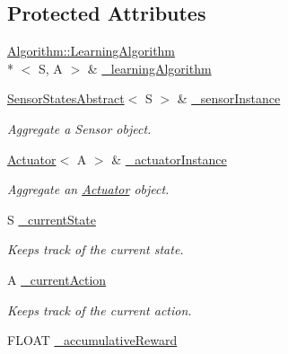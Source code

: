 \subsection*{Protected Attributes}
\begin{DoxyCompactItemize}
\item 
\hyperlink{classAI_1_1Algorithm_1_1LearningAlgorithm}{Algorithm\-::\-Learning\-Algorithm}\\*
$<$ S, A $>$ \& \hyperlink{classAI_1_1Agent_ae61529c109e21748dca77509b58f1f8e}{\-\_\-learning\-Algorithm}
\item 
\hypertarget{classAI_1_1Agent_a47f05ad26341cb3dd19790deab83b027}{\hyperlink{classAI_1_1SensorStatesAbstract}{Sensor\-States\-Abstract}$<$ S $>$ \& \hyperlink{classAI_1_1Agent_a47f05ad26341cb3dd19790deab83b027}{\-\_\-sensor\-Instance}}\label{classAI_1_1Agent_a47f05ad26341cb3dd19790deab83b027}

\begin{DoxyCompactList}\small\item\em Aggregate a Sensor object. \end{DoxyCompactList}\item 
\hypertarget{classAI_1_1Agent_a1a9517c181c1514ffa4f8df2bb68a5dc}{\hyperlink{classAI_1_1Actuator}{Actuator}$<$ A $>$ \& \hyperlink{classAI_1_1Agent_a1a9517c181c1514ffa4f8df2bb68a5dc}{\-\_\-actuator\-Instance}}\label{classAI_1_1Agent_a1a9517c181c1514ffa4f8df2bb68a5dc}

\begin{DoxyCompactList}\small\item\em Aggregate an \hyperlink{classAI_1_1Actuator}{Actuator} object. \end{DoxyCompactList}\item 
\hypertarget{classAI_1_1Agent_a3476836f8e24014e2d0e5bd3fcd06c4f}{S \hyperlink{classAI_1_1Agent_a3476836f8e24014e2d0e5bd3fcd06c4f}{\-\_\-current\-State}}\label{classAI_1_1Agent_a3476836f8e24014e2d0e5bd3fcd06c4f}

\begin{DoxyCompactList}\small\item\em Keeps track of the current state. \end{DoxyCompactList}\item 
\hypertarget{classAI_1_1Agent_a92741f4d9a5324c909e63ab330379411}{A \hyperlink{classAI_1_1Agent_a92741f4d9a5324c909e63ab330379411}{\-\_\-current\-Action}}\label{classAI_1_1Agent_a92741f4d9a5324c909e63ab330379411}

\begin{DoxyCompactList}\small\item\em Keeps track of the current action. \end{DoxyCompactList}\item 
F\-L\-O\-A\-T \hyperlink{classAI_1_1Agent_aa4c5b41816bb39212727186a4af1afec}{\-\_\-accumulative\-Reward}
\end{DoxyCompactItemize}


